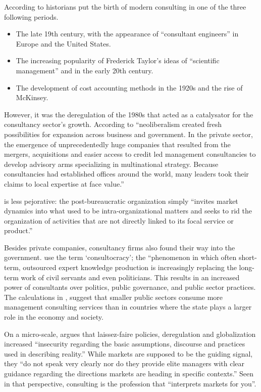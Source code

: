 \documentclass[12pt]{article}
\begin{document}
According to \citet[46]{mazzucato2023} historians put the birth of
modern consulting in one of the three following periods.

\begin{itemize}
\item
  The late 19th century, with the appearance of ``consultant engineers''
  in Europe and the United States.
\item
  The increasing popularity of Frederick Taylor's ideas of ``scientific
  management'' and in the early 20th century.
\item
  The development of cost accounting methods in the 1920s and the rise
  of McKinsey.
\end{itemize}

However, it was the deregulation of the 1980s that acted as a
catalysator for the consultancy sector's growth. According to
\citet[61]{mazzucato2023} ``neoliberalism created fresh possibilities
for expansion across business and government. In the private sector, the
emergence of unprecedentedly huge companies that resulted from the
mergers, acquisitions and easier access to credit led management
consultancies to develop advisory arms specializing in multinational
strategy. Because consultancies had established offices around the
world, many leaders took their claims to local expertise at face
value.''

\citet[3]{furusten2000} is less pejorative: the post-bureaucratic
organization simply ``invites market dynamics into what used to be
intra-organizational matters and seeks to rid the organization of
activities that are not directly linked to its focal service or
product.''

Besides private companies, consultancy firms also found their way into
the government. \citet[242]{ylonen2019} use the term `consultocracy';
the ``phenomenon in which often short-term, outsourced expert knowledge
production is increasingly replacing the long-term work of civil
servants and even politicians. This results in an increased power of
consultants over politics, public governance, and public sector
practices. The calculations in \citet{saintmartin2017}, suggest that
smaller public sectors consume more management consulting services than
in countries where the state plays a larger role in the economy and
society.

On a micro-scale, \citet[370]{pollner1991} argues that laissez-faire
policies, deregulation and globalization increased ``insecurity
regarding the basic assumptions, discourse and practices used in
describing reality.'' While markets are supposed to be the guiding
signal, they ``do not speak very clearly nor do they provide elite
managers with clear guidance regarding the directions markets are
heading in specific contexts.'' Seen in that perspective, consulting is
the profession that ``interprets markets for you''. \citep[
37]{leicht2006}
\end{document}
